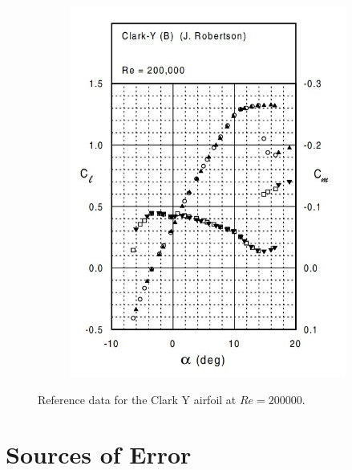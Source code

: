 \documentclass[runningheads]{llncs}
\begin{document}
\begin{figure}[h]
\begin{subfigure}[b]{0.45\textwidth}
         \includegraphics[width=\textwidth]{figures/clark_y_reference_cl_cm.jpg}
         \caption{}
         \label{fig:reference_cl_cm}
     \end{subfigure}
    \caption{Reference data for the Clark Y airfoil at $Re = 200000$.}
    \label{fig:clark_y_reference}
\end{figure}




\section{Sources of Error}\label{sec:source_of_error}
\end{document}
